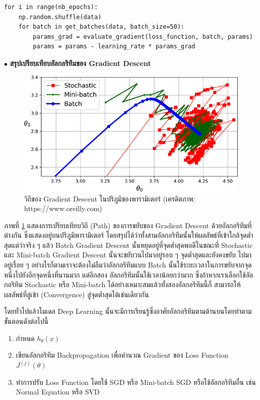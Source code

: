 \begin{lstlisting}[style=MyPython]
for i in range(nb_epochs):
    np.random.shuffle(data)
    for batch in get_batches(data, batch_size=50):
        params_grad = evaluate_gradient(loss_function, batch, params)
        params = params - learning_rate * params_grad
\end{lstlisting}

\noindent $\bullet$ \textbf{สรุปเปรียบเทียบอัลกอริทึมของ Gradient Descent}

\begin{figure}[htbp]
    \centering
    \includegraphics[width=0.9\linewidth]{fig/gradient_descent_path.png}
    \caption{วิถีของ Gradient Descent ในปริภูมิของพารามิเตอร์ (เครดิตภาพ: https://www.oreilly.com)}
    \label{fig:gradient_descent_path}
\end{figure}

ภาพที่ \ref{fig:gradient_descent_path} แสดงการเปรียบเทียบวิถี (Path) ของการขยับของ Gradient Descent ด้วยอัลกอริทึมที่ต่างกัน
ซึ่งแสดงอยู่บนปริภูมิพารามิเตอร์ โดยสรุปได้ว่าทั้งสามอัลกอริทึมนั้นให้ผลลัพธ์ที่เข้าใกล้จุดต่ำสุดแต่ว่าจริง ๆ แล้ว Batch Gradient Descent 
นั้นหยุดอยู่ที่จุดต่ำสุดพอดีในขณะที่ Stochastic และ Mini-batch Gradient Descent นั้นจะขยับวนไปมาอยู่รอบ ๆ จุดต่ำสุดและยังคงขยับ%
ไปมาอยู่เรื่อย ๆ อย่างไรก็ตามเราจะต้องไม่ลืมว่าอัลกอริทึมแบบ Batch นั้นใช้ระยะเวลาในการขยับจากจุดหนึ่งไปยังอีกจุดหนึ่งที่นานมาก แต่อีกสอง%
อัลกอริทึมนั้นใช้เวลาน้อยกว่ามาก ซึ่งถ้าหากเราเลือกใช้อัลกอริทึม Stochastic หรือ Mini-batch ได้อย่างเหมาะสมแล้วทั้งสองอัลกอริทึมนี้ก็%
สามารถให้ผลลัพธ์ที่ลู่เข้า (Convergence) สู่จุดต่ำสุดได้เช่นเดียวกัน

โดยทั่วไปแล้วโมเดล Deep Learning นั้นจะมีการเรียนรู้ซึ่งอาศัยอัลกอริทึมตามด้านบนโดยทำตามขั้นตอนดังต่อไปนี้

\begin{enumerate}[topsep=0pt,noitemsep]
    \item กำหนด $h_\theta(x)$
    
    \item เขียนอัลกอริทึม Backpropagation เพื่อคำนวณ Gradient ของ Loss Function $J^{(j)}(\theta)$
    
    \item ทำการปรับ Loss Function โดยใช้ SGD หรือ Mini-batch SGD หรือใช้อัลกอริทึมอื่น เช่น Normal Equation หรือ SVD
\end{enumerate}

